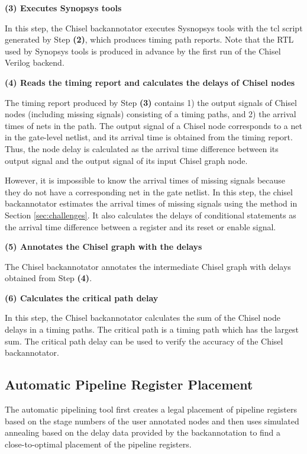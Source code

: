 {\bf (3) Executes Synopsys tools}

In this step, the Chisel backannotator executes Sysnopsys tools with the tcl script generated by Step {\bf (2)}, which produces timing path reports. Note that the RTL used by Synopsys tools is produced in advance by the first run of the Chisel Verilog backend.

{\bf (4) Reads the timing report and calculates the delays of Chisel nodes}

The timing report produced by Step {\bf (3)} contains 1) the output signals of Chisel nodes (including missing signals) consisting of a timing paths, and 2) the arrival times of nets in the path. The output signal of a Chisel node corresponds to a net in the gate-level netlist, and its arrival time is obtained from the timing report. Thus, the node delay is calculated as the arrival time difference between its output signal and the output signal of its input Chisel graph node.

However, it is impossible to know the arrival times of missing signals because they do not have a corresponding net in the gate netlist. In this step, the chisel backannotator estimates the arrival times of missing signals using the method in Section \ref{sec:challenges}. It also calculates the delays of conditional statements as the arrival time difference between a register and its reset or enable signal.

{\bf (5) Annotates the Chisel graph with the delays}

The Chisel backannotator annotates the intermediate Chisel graph with delays obtained from Step {\bf (4)}.

{\bf (6) Calculates the critical path delay}

In this step, the Chisel backannotator calculates the sum of the Chisel node delays in a timing paths. The critical path is a timing path which has the largest sum. The critical path delay can be used to verify the accuracy of the Chisel backannotator.

\subsection{Automatic Pipeline Register Placement}
The automatic pipelining tool first creates a legal placement of pipeline registers based on the stage numbers of the user annotated nodes and then uses simulated annealing based on the delay data provided by the backannotation to find a close-to-optimal placement of the pipeline registers. 

